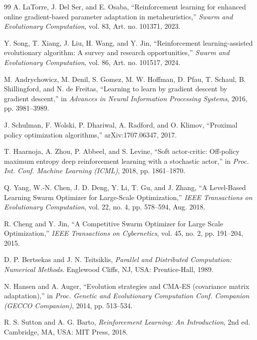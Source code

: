 \documentclass[conference]{IEEEtran}
\begin{document}
\begin{thebibliography}{99}
 A. LaTorre, J. Del Ser, and E. Osaba, ``Reinforcement learning for enhanced online gradient-based parameter adaptation in metaheuristics,'' \emph{Swarm and Evolutionary Computation}, vol. 83, Art. no. 101371, 2023.

 Y. Song, T. Xiang, J. Liu, H. Wang, and Y. Jin, ``Reinforcement learning-assisted evolutionary algorithm: A survey and research opportunities,'' \emph{Swarm and Evolutionary Computation}, vol. 86, Art. no. 101517, 2024.

 M. Andrychowicz, M. Denil, S. Gomez, M. W. Hoffman, D. Pfau, T. Schaul, B. Shillingford, and N. de Freitas, ``Learning to learn by gradient descent by gradient descent,'' in \emph{Advances in Neural Information Processing Systems}, 2016, pp. 3981--3989.

 J. Schulman, F. Wolski, P. Dhariwal, A. Radford, and O. Klimov, ``Proximal policy optimization algorithms,'' arXiv:1707.06347, 2017.

 T. Haarnoja, A. Zhou, P. Abbeel, and S. Levine, ``Soft actor-critic: Off-policy maximum entropy deep reinforcement learning with a stochastic actor,'' in \emph{Proc. Int. Conf. Machine Learning (ICML)}, 2018, pp. 1861--1870.

 Q. Yang, W.-N. Chen, J. D. Deng, Y. Li, T. Gu, and J. Zhang, ``A Level-Based Learning Swarm Optimizer for Large-Scale Optimization,'' \emph{IEEE Transactions on Evolutionary Computation}, vol. 22, no. 4, pp. 578--594, Aug. 2018.

 R. Cheng and Y. Jin, ``A Competitive Swarm Optimizer for Large Scale Optimization,'' \emph{IEEE Transactions on Cybernetics}, vol. 45, no. 2, pp. 191--204, 2015.

 D. P. Bertsekas and J. N. Tsitsiklis, \emph{Parallel and Distributed Computation: Numerical Methods}. Englewood Cliffs, NJ, USA: Prentice-Hall, 1989.

 N. Hansen and A. Auger, ``Evolution strategies and CMA-ES (covariance matrix adaptation),'' in \emph{Proc. Genetic and Evolutionary Computation Conf. Companion (GECCO Companion)}, 2014, pp. 513--534.

 R. S. Sutton and A. G. Barto, \emph{Reinforcement Learning: An Introduction}, 2nd ed. Cambridge, MA, USA: MIT Press, 2018.


\end{thebibliography}
\end{document}
